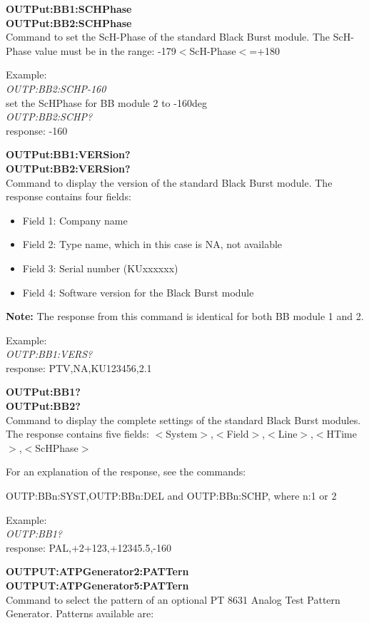 \textbf{OUTPut:BB1:SCHPhase}\\
\textbf{OUTPut:BB2:SCHPhase}\\
Command to set the ScH-Phase of the standard Black Burst module. The ScH-Phase value must be in the range: -179$<$ScH-Phase$<$=+180

Example:\\
\textit{OUTP:BB2:SCHP-160}\\
set the ScHPhase for BB module 2 to -160deg\\
\textit{OUTP:BB2:SCHP?}\\
response: -160

\textbf{OUTPut:BB1:VERSion?}\\
\textbf{OUTPut:BB2:VERSion?}\\
Command to display the version of the standard Black Burst module. The response contains four fields:
\begin{itemize}
\item Field 1: Company name
\item Field 2: Type name, which in this case is NA, not available
\item Field 3: Serial number (KUxxxxxx)
\item Field 4: Software version for the Black Burst module
\end{itemize}

\textbf{Note:} The response from this command is identical for both BB module 1 and 2. 

Example:\\
\textit{OUTP:BB1:VERS?}\\
response: PTV,NA,KU123456,2.1

\textbf{OUTPut:BB1?}\\
\textbf{OUTPut:BB2?}\\
Command to display the complete settings of the standard Black Burst modules. The response contains five fields: $<$System$>$,$<$Field$>$,$<$Line$>$,$<$HTime$>$,$<$ScHPhase$>$

For an explanation of the response, see the commands: 

OUTP:BBn:SYST,OUTP:BBn:DEL and OUTP:BBn:SCHP, where n:1 or 2

Example:\\
\textit{OUTP:BB1?}\\
response: PAL,+2+123,+12345.5,-160

\textbf{OUTPUT:ATPGenerator2:PATTern}\\
\textbf{OUTPUT:ATPGenerator5:PATTern}\\
Command to select the pattern of an optional PT 8631 Analog Test Pattern Generator. Patterns available are:

